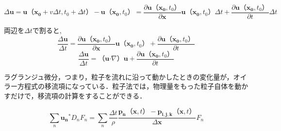 \documentclass[a4j,12pt]{jreport}
\begin{document}
$$ \varDelta \bm{u} = \bm{u} （\bm{x_0}+v\varDelta t,t_0+\varDelta t）  - \bm{u} （\bm{x_0},t_0）  = \frac{\partial \bm{u} （\bm{x_0},t_0） }{\partial \bm{x}}\bm{u} （\bm{x_0},t_0） \varDelta t + \frac{\partial \bm{u} （\bm{x_0},t_0） }{\partial t}\varDelta t$$

両辺を$\varDelta t$で割ると,
$$ \frac{\varDelta \bm{u}}{\varDelta t} = \frac{\partial \bm{u} （\bm{x_0},t_0） }{\partial \bm{x}}\bm{u} （\bm{x_0},t_0）  + \frac{\partial \bm{u} （\bm{x_0},t_0） }{\partial t}$$
$$ \frac{\varDelta \bm{u}}{\varDelta t} =  （\bm{u}\boldsymbol{\cdot}\nabla） \bm{u} + \frac{\partial \bm{u} （\bm{x_0},t_0） }{\partial t}$$

ラグランジュ微分，つまり，粒子を流れに沿って動かしたときの変化量が，オイラー方程式の移流項になっている．粒子法では，物理量をもった粒子自体を動かすだけで，移流項の計算をすることができる．






\begin{equation}
\sum_{n}\bm{u_n}^*D_nF_n= \sum_{n}\frac{\varDelta t}{\rho}\frac{\bm{p_n} （\bm{x},t）  - \bm{p_{i,j,k}} （\bm{x},t） }{\varDelta \bm{x}}F_n
\end{equation}
\end{document}
